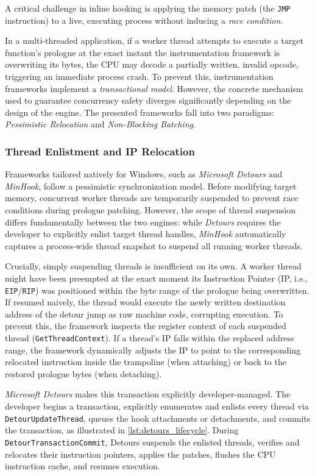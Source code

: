 A critical challenge in inline hooking is applying the memory patch (the \texttt{JMP} instruction) to a live, executing process without inducing a \emph{race condition}.

In a multi-threaded application, if a worker thread attempts to execute a target function's prologue at the exact instant the instrumentation framework is overwriting its bytes, the CPU may decode a partially written, invalid opcode, triggering an immediate process crash.
To prevent this, instrumentation frameworks implement a \emph{transactional model}.
However, the concrete mechanism used to guarantee concurrency safety diverges significantly depending on the design of the engine.
The presented frameworks fall into two paradigms: \emph{Pessimistic Relocation} and \emph{Non-Blocking Batching}.

\subsubsection{Thread Enlistment and IP Relocation}

Frameworks tailored natively for Windows, such as \emph{Microsoft Detours} and \emph{MinHook}, follow a pessimistic synchronization model.
Before modifying target memory, concurrent worker threads are temporarily suspended to prevent race conditions during prologue patching.
However, the scope of thread suspension differs fundamentally between the two engines: while \emph{Detours} requires the developer to explicitly enlist target thread handles, \emph{MinHook} automatically captures a process-wide thread snapshot to suspend all running worker threads.

Crucially, simply suspending threads is insufficient on its own.
A worker thread might have been preempted at the exact moment its Instruction Pointer (\ac{IP}, i.e., \texttt{EIP}/\texttt{RIP}) was positioned within the byte range of the prologue being overwritten.
If resumed naively, the thread would execute the newly written destination address of the detour jump as raw machine code, corrupting execution.
To prevent this, the framework inspects the register context of each suspended thread (\texttt{GetThreadContext}).
If a thread's \ac{IP} falls within the replaced address range, the framework dynamically adjusts the \ac{IP} to point to the corresponding relocated instruction inside the trampoline (when attaching) or back to the restored prologue bytes (when detaching).

\emph{Microsoft Detours} makes this transaction explicitly developer-managed.
The developer begins a transaction, explicitly enumerates and enlists every thread via \texttt{DetourUpdateThread}, queues the hook attachments or detachments, and commits the transaction, as illustrated in \cref{lst:detours_lifecycle}.
During \texttt{DetourTransactionCommit}, Detours suspends the enlisted threads, verifies and relocates their instruction pointers, applies the patches, flushes the CPU instruction cache, and resumes execution.

